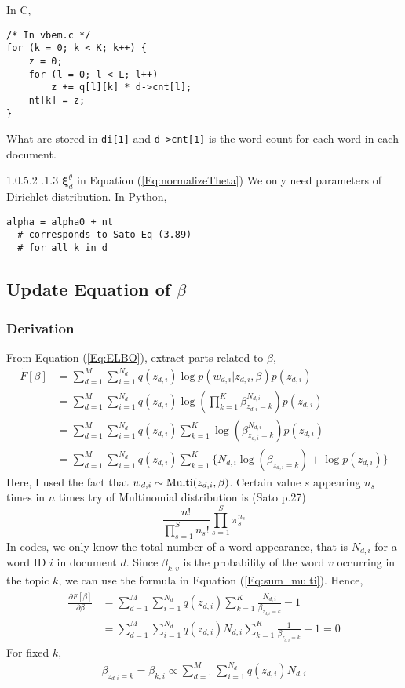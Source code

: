\documentclass[a4paper,10.5pt,dvipdfmx]{jarticle}  %
\makeatletter
\newcommand{\subsubsubsection}{\@startsection{paragraph}{4}{\z@}%
    {1.0\Cvs \@plus.5\Cdp \@minus.2\Cdp}%
    {.1\Cvs \@plus.3\Cdp}%
    {\reset@font\normalsize}
  }
\makeatother
\begin{document}
In C,
\begin{lstlisting}[style=C]
/* In vbem.c */
for (k = 0; k < K; k++) {
	z = 0;
	for (l = 0; l < L; l++)
		z += q[l][k] * d->cnt[l];
	nt[k] = z;
}
\end{lstlisting}

What are stored in \texttt{di[1]} and \texttt{d->cnt[1]} is the word count for each word in each document.

\subsubsubsection{$\boldsymbol{\xi}_{d}^{\theta}$ in Equation (\ref{Eq:normalizeTheta})}
We only need parameters of Dirichlet distribution. In Python,
\begin{lstlisting}[style=Python]
alpha = alpha0 + nt 
  # corresponds to Sato Eq (3.89)
  # for all k in d
\end{lstlisting}


\subsection{Update Equation of $\beta$}
\subsubsection{Derivation}
From Equation (\ref{Eq:ELBO}), extract parts related to $\beta$,
\begin{align}
  \widetilde{F}[\beta] &= \sum_{d=1}^{M} \sum_{i=1}^{N_d} q(z_{d,i}) \log p(w_{d,i} | z_{d,i}, \beta) p(z_{d,i})\\
&= \sum_{d=1}^{M} \sum_{i=1}^{N_d} q(z_{d,i}) \log \left( \prod_{k=1}^{K} \beta_{z_{d,i}=k}^{N_{d,i}} \right) p(z_{d,i})\\
&= \sum_{d=1}^{M} \sum_{i=1}^{N_d} q(z_{d,i}) \sum_{k=1}^{K} \log \left( \beta_{z_{d,i}=k}^{N_{d,i}} \right) p(z_{d,i})\\
&= \sum_{d=1}^{M} \sum_{i=1}^{N_d} q(z_{d,i}) \sum_{k=1}^{K} \{N_{d,i} \log  \left( \beta_{z_{d,i}=k} \right) + \log p(z_{d,i}) \}
\end{align}
Here, I used the fact that $w_{d,i} \sim {\rm Multi}(z_{d,i}, \beta)$. Certain value $s$ appearing $n_s$ times in $n$ times try of Multinomial distribution is (Sato p.27)\begin{equation}\frac{n!}{\prod_{s=1}^{S} n_s!} \prod_{s=1}^{S} \pi_s^{n_s} \label{Eq:sum_multi}\end{equation}In codes, we only know the total number of a word appearance, that is $N_{d,i}$ for a word ID $i$ in document $d$. Since $\beta_{k,v}$ is the probability of the word $v$ occurring in the topic $k$, we can use the formula in Equation (\ref{Eq:sum_multi}). 
Hence,
\begin{align}
  \frac{\partial \widetilde{F}[\beta]}{\partial \beta} &= \sum_{d=1}^{M} \sum_{i=1}^{N_d} q(z_{d,i}) \sum_{k=1}^{K} \frac{N_{d,i}}{\beta_{z_{d,i}=k}} - 1\\
&= \sum_{d=1}^{M} \sum_{i=1}^{N_d} q(z_{d,i}) N_{d,i} \sum_{k=1}^{K}  \frac{1}{\beta_{z_{d,i}=k}} - 1  = 0
\end{align}
For fixed $k$,
\begin{align}
  \beta_{z_{d,i} = k} = \beta_{k, i} \propto \sum_{d=1}^{M} \sum_{i=1}^{N_d} q(z_{d,i}) N_{d,i}
\end{align}
\end{document}
